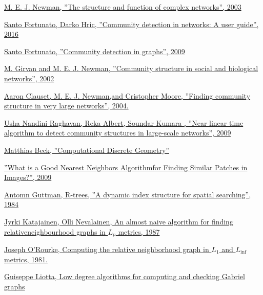 \documentclass{article}
\begin{document}
\begin{thebibliography}{9}

 \href{https://arxiv.org/pdf/cond-mat/0303516.pdf}{M. E. J. Newman, ''The structure and function of complex networks'', 2003}
 
 \href{https://arxiv.org/abs/1608.00163}{Santo Fortunato, Darko Hric, ''Community detection in networks:  A user guide'', 2016}

 \href{https://arxiv.org/abs/0906.0612}{Santo Fortunato, ''Community detection in graphs'', 2009}

 \href{https://www.pnas.org/content/99/12/7821}{M. Girvan and M. E. J. Newman, ''Community structure in social and biological networks'', 2002}

 \href{https://arxiv.org/pdf/cond-mat/0408187.pdf}{Aaron Clauset, M. E. J. Newman,and Cristopher Moore, ''Finding community structure in very large networks'', 2004.}

 \href{https://arxiv.org/abs/0709.2938}{Usha Nandini Raghavan, Reka Albert, Soundar Kumara , ''Near linear time algorithm to detect community structures in large-scale networks'', 2009}

 \href{http://math.sfsu.edu/beck/teach/870/brendan.pdf}{Matthias Beck, ''Computational Discrete Geometry''}

 \href{http://www1.cs.columbia.edu/CAVE/publications/pdfs/Kumar_ECCV08_2.pdf}{''What is a Good Nearest Neighbors Algorithmfor Finding Similar Patches in Images?'', 2009}

 \href{http://www-db.deis.unibo.it/courses/SI-LS/papers/Gut84.pdf}{Antomn Guttman, R-trees, ''A dynamic index structure for spatial searching'', 1984}

 \href{http://www.numdam.org/article/ITA_1987__21_2_199_0.pdf}{Jyrki Katajainen, Olli Nevalainen, An almost naive algorithm for finding relativeneighbourhood graphs in $L_p$ metrics, 1987}

 \href{http://cs.smith.edu/~jorourke/Papers/RelativeNeighborhood.pdf}{Joseph O'Rourke, Computing the relative neighborhood graph in $L_1$ and $L_{\inf}$ metrics, 1981.}

 \href{ftp://ftp.cs.brown.edu/pub/techreports/96/cs96-28.pdf}{Guiseppe Liotta, Low degree algorithms for computing and checking Gabriel graphs}

\end{thebibliography} 
\end{document}
